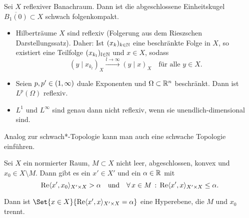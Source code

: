 \documentclass{cheat-sheet}
\newcommand{\scp}[2]{\left( #1 \!\mid\! #2 \right)} %
\renewcommand{\Re}{\operatorname{Re}} %
\newcommand{\convWith}[1]{\xrightarrow{#1 \to \infty}} %
\begin{document}
\begin{satz}
  Sei $X$ reflexiver Banachraum. Dann ist die abgeschlossene Einheitskugel $\overline{B_1(0)} \subset X$ schwach folgenkompakt.
\end{satz}


\begin{bspe}
  \begin{itemize}
    \item Hilberträume $X$ sind reflexiv (Folgerung aus dem Rieszschen Darstellungssatz). Daher: Ist $(x_k)_{k \in \mathbb{N}}$ eine beschränkte Folge in $X$, so existiert eine Teilfolge $(x_{k_l})_{l \in \mathbb{N}}$ und $x \in X$, sodass
    \[
      \scp{y}{x_{k_l}}_X \convWith{l} \scp{y}{x}_X
      \quad \text{für alle $y \in X$.}
    \]
    \item Seien $p, p' \in \left( 1, \infty \right)$ duale Exponenten und $\Omega \subset \mathbb{R}^n$ beschränkt. Dann ist $L^p(\Omega)$ reflexiv.
    \item $L^1$ und $L^\infty$ sind genau dann nicht reflexiv, wenn sie unendlich-dimensional sind.
  \end{itemize}
\end{bspe}

\begin{bem}
  Analog zur schwach*-Topologie kann man auch eine schwache Topologie einführen.
\end{bem}



\begin{satz}[Trennungssatz]
  Sei $X$ ein normierter Raum, $M \subset X$ nicht leer, abgeschlossen, konvex und $x_0 \in X \setminus M$. Dann gibt es ein $x' \in X'$ und ein $\alpha \in \mathbb{R}$ mit
  \[
    \Re \langle x', x_0 \rangle_{X' {\times} X} > \alpha
    \quad \text{und} \quad
    \fa{x \in M} \Re \langle x', x \rangle_{X' \times X} \leq \alpha.
  \]
\end{satz}


\begin{bem}
  Dann ist $\Set{ x \in X }{ \Re \langle x', x \rangle_{X' {\times} X} = \alpha }$ eine Hyperebene, die $M$ und $x_0$ trennt.
\end{bem}
\end{document}

